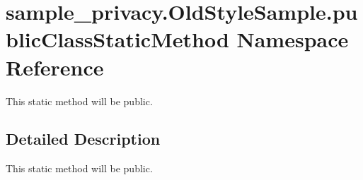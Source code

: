\hypertarget{namespacesample__privacy_1_1_old_style_sample_1_1public_class_static_method}{\section{sample\-\_\-privacy.\-Old\-Style\-Sample.\-public\-Class\-Static\-Method Namespace Reference}
\label{namespacesample__privacy_1_1_old_style_sample_1_1public_class_static_method}
}


This static method will be public.  




\subsection{Detailed Description}
This static method will be public. 
